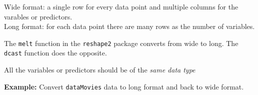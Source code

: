 \documentclass[a4paper]{article}\usepackage[]{graphicx}\usepackage[]{xcolor}
\begin{document}
\noindent Wide format: a single row for every data point and multiple columns for the varables or predictors. \vspace{1em} \\
Long format: for each data point there are many rows as the number of variables.    \vspace{1em} 

\noindent The \texttt{melt} function in the \texttt{reshape2} package converts from wide to long. The \texttt{dcast} function does the opposite. \vspace{1em}

\noindent All the variables or predictors should be of the \textit{same data type} \vspace{1em}

\noindent \textbf{Example:} Convert \texttt{dataMovies} data to long format and back to wide format.
\end{document}
